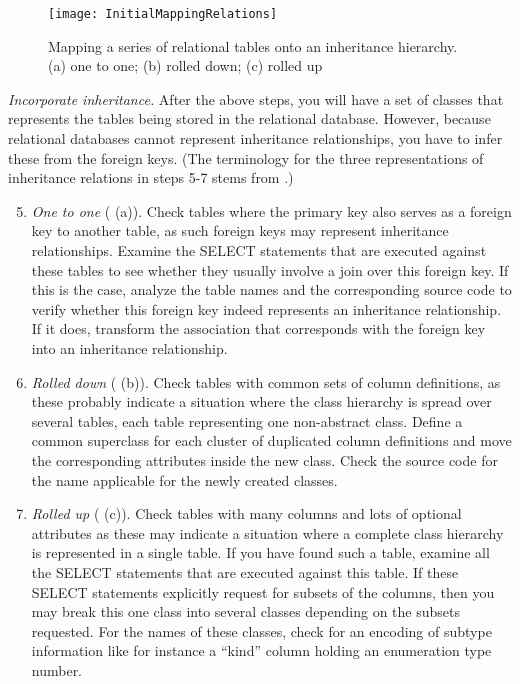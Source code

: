 \documentclass[a4paper,10pt,twoside]{book}
\begin{document}
\begin{figure}
\begin{center}
\texttt{[image: InitialMappingRelations]}
\caption{Mapping a series of relational tables onto an inheritance hierarchy. (a) one to 
one; (b) rolled down; (c) rolled up}
\end{center}
\end{figure}

\noindent
\emph{Incorporate inheritance.}
After the above steps, you will have a set of classes that represents the tables being 
stored in the relational database. However, because relational databases cannot represent 
inheritance relationships, you have to infer these from the foreign keys. (The terminology 
for the three representations of inheritance relations in steps 5-7 stems from 
\cite{Fros94a}.)

\begin{enumerate}\setcounter{enumi}{4}
  \item \emph{One to one} ( (a)). Check tables where the 
primary key also serves as a foreign key to another table, as such foreign keys may 
represent inheritance relationships. Examine the SELECT statements that are executed 
against these tables to see whether they usually involve a join over this foreign key. If 
this is the case, analyze the table names and the corresponding source code to verify 
whether this foreign key indeed represents an inheritance relationship. If it does, 
transform the association that corresponds with the foreign key into an inheritance 
relationship.

  \item \emph{Rolled down} ( (b)). Check tables with common 
sets of column definitions, as these probably indicate a situation where the class 
hierarchy is spread over several tables, each table representing one non-abstract class. 
Define a common superclass for each cluster of duplicated column definitions and move the 
corresponding attributes inside the new class. Check the source code for the name 
applicable for the newly created classes.

  \item \emph{Rolled up} ( (c)). Check tables with many 
columns and lots of optional attributes as these may indicate a situation where a complete 
class hierarchy is represented in a single table. If you have found such a table, examine 
all the SELECT statements that are executed against this table. If these SELECT statements 
explicitly request for subsets of the columns, then you may break this one class into 
several classes depending on the subsets requested. For the names of these classes, check 
for an encoding of subtype information like for instance a ``kind'' column holding an 
enumeration type number.

\end{enumerate}
\end{document}
